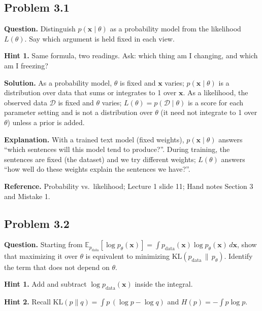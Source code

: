 \documentclass[11pt]{article}
\begin{document}
\subsection*{Problem 3.1}
\textbf{Question.} Distinguish $p(\mathbf{x}\mid\theta)$ as a probability model from the likelihood $L(\theta)$. Say which argument is held fixed in each view.

\textbf{Hint 1.} Same formula, two readings. Ask: which thing am I changing, and which am I freezing?

\textbf{Solution.} As a probability model, $\theta$ is fixed and $\mathbf{x}$ varies; $p(\mathbf{x}\mid\theta)$ is a distribution over data that sums or integrates to 1 over $\mathbf{x}$. As a likelihood, the observed data $\mathcal{D}$ is fixed and $\theta$ varies; $L(\theta) = p(\mathcal{D}\mid\theta)$ is a score for each parameter setting and is not a distribution over $\theta$ (it need not integrate to 1 over $\theta$) unless a prior is added.

\textbf{Explanation.} With a trained text model (fixed weights), $p(\mathbf{x}\mid\theta)$ answers ``which sentences will this model tend to produce?''. During training, the sentences are fixed (the dataset) and we try different weights; $L(\theta)$ answers ``how well do these weights explain the sentences we have?''.

\textbf{Reference.} Probability vs.\ likelihood; Lecture 1 slide 11; Hand notes Section 3 and Mistake 1.

\subsection*{Problem 3.2}
\textbf{Question.} Starting from $\mathbb{E}_{p_{\text{data}}}[\log p_\theta(\mathbf{x})] = \int p_{\text{data}}(\mathbf{x})\log p_\theta(\mathbf{x})\,d\mathbf{x}$, show that maximizing it over $\theta$ is equivalent to minimizing $\mathrm{KL}(p_{\text{data}}\,\|\,p_\theta)$. Identify the term that does not depend on $\theta$.

\textbf{Hint 1.} Add and subtract $\log p_{\text{data}}(\mathbf{x})$ inside the integral.

\textbf{Hint 2.} Recall $\mathrm{KL}(p\|q) = \int p\,(\log p - \log q)$ and $H(p) = -\int p\log p$.
\end{document}
